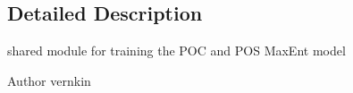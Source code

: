 

\subsection{Detailed Description}
shared module for training the POC and POS MaxEnt model \begin{DoxyAuthor}{Author}
vernkin 
\end{DoxyAuthor}
